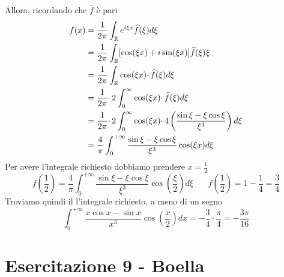 Allora, ricordando che $\hat{f}$ è pari
\begin{align*}
f( x) & =\frac{1}{2\pi }\int _{\mathbb{R} } e^{i\xi x}\widehat{f}( \xi ) d\xi \\
 & =\frac{1}{2\pi }\int _{\mathbb{R} }[\cos( \xi x) +i\sin( \xi x)]\widehat{f}( \xi ) \xi \\
 & =\frac{1}{2\pi }\int _{\mathbb{R} }\cos( \xi x) \cdotp \widehat{f}( \xi ) d\xi \\
 & =\frac{1}{2\pi } \cdotp 2\int ^{\infty }_{0}\cos( \xi x) \cdotp \widehat{f}( \xi ) d\xi \\
 & =\frac{1}{2\pi } \cdotp 2\int ^{\infty }_{0}\cos( \xi x) \cdotp 4\left(\frac{\sin \xi -\xi \cos \xi }{\xi ^{3}}\right) d\xi \\
 & =\frac{4}{\pi }\int ^{+\infty }_{0}\frac{\sin \xi -\xi \cos \xi }{\xi ^{3}}\cos( \xi x) d\xi 
\end{align*}
Per avere l'integrale richiesto dobbiamo prendere $x=\frac{1}{2}$
\begin{equation*}
f\left(\frac{1}{2}\right) =\frac{4}{\pi }\int ^{+\infty }_{0}\frac{\sin \xi -\xi \cos \xi }{\xi ^{3}}\cos\left(\frac{\xi }{2}\right) d\xi \ \ \ \ \ \ \ \ f\left(\frac{1}{2}\right) =1-\frac{1}{4} =\frac{3}{4}
\end{equation*}
Troviamo quindi il l'integrale richiesto, a meno di un segno
\begin{equation*}
\int ^{+\infty }_{0}\frac{x\cos x-\sin x}{x^{3}}\cos\left(\frac{x}{2}\right) dx=-\frac{3}{4} \cdotp \frac{\pi }{4} =-\frac{3\pi }{16}
\end{equation*}
\chapter{Esercitazione 9 - Boella}
\ParteEsercizi

